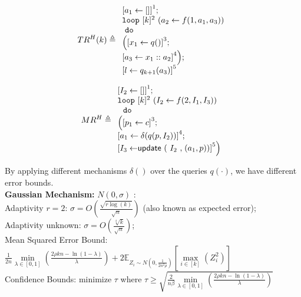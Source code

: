 \documentclass[a4paper,11pt]{article}
\begin{document}
\begin{example}
\[
TR^H(k) \triangleq
{
\begin{array}{l}
    \clabel{a_1 \leftarrow [] }^1; \\
    \eloop ~ [k]^{2} ~ (a_2 \leftarrow f(1, a_1, a_3)) \\
    ~ \edo ~ \\
    \Big(
     \clabel{x_1 \leftarrow q() }^3 ; \\
    \clabel{a_3 \leftarrow x_1 :: a_2 }^4     \Big);\\
    \clabel{l \leftarrow q_{k + 1}(a_3)}^{5}\\
\end{array}
}
\]
\end{example}
%
\begin{example}
\[
MR^H \triangleq
\begin{array}{l}
    \left[I_2 \leftarrow [] \right]^1; \\
    \eloop ~ [k]^{2} ~ (I_2 \leftarrow f(2, I_1, I_3)) \\ 
    \ ~ \edo ~ \\ \Big(
    \left[p_1 \leftarrow c \right]^3 ; \\
    \left[a_1 \leftarrow \delta(q(p, I_2)) \right]^4; \\
    \left[I_3 \leftarrow \eupdt( {I_2}, (a_1, p))  \right]^5
    \Big) 
\end{array}
\]
\end{example}
%
%
By applying different mechanisms $\delta()$ over the queries $q(\cdot)$, we have different error bounds.
\\
\textbf{Gaussian Mechanism:} $N(0, \sigma)$ \cite{dwork2015preserving}:
\\
Adaptivity $r = 2$: 
$ \sigma = O \left(\frac{\sqrt{r \log(k)}}{\sqrt{n}} \right)$ (also known as expected error);
\\
Adaptivity unknown:
$ \sigma = O\left(\frac{\sqrt[4]{k}}{\sqrt{n}} \right)$;
\\
{Mean Squared Error Bound:} 
$ \frac{1}{2n} \min\limits_{\lambda \in [0, 1]}
\left( \frac{2\rho k n - \ln(1 - \lambda)}{\lambda} 
\right)
+ 2 \mathbb{E}_{Z_i \sim N(0, \frac{1}{2n^2 \rho})}
\left[ \max\limits_{i \in [k]} (Z_i^2) \right]$
%
\\
{Confidence Bounds:} minimize $\tau$ where
$\tau \geq \sqrt{\frac{2}{n \beta}
\min\limits_{\lambda \in [0, 1]}
\left( \frac{2\rho k n - \ln(1 - \lambda)}{\lambda} 
\right)
}$
\end{document}
